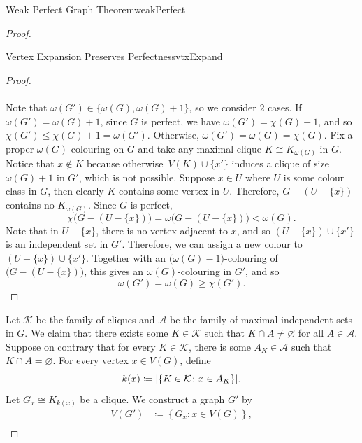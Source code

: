 \documentclass[math]{amznotes}
\theoremstyle{remark}
\begin{document}
\begin{thmbox}{Weak Perfect Graph Theorem}{weakPerfect}
\begin{proof}
\begin{lembox}{Vertex Expansion Preserves Perfectness}{vtxExpand}
\begin{proof}
                \\\\
                Note that $\omega(G') \in \{\omega(G), \omega(G) + 1\}$, so we consider $2$ cases. If $\omega(G') = \omega(G) + 1$, since $G$ is perfect, we have $\omega(G') = \chi(G) + 1$, and so $\chi(G') \leq \chi(G) + 1 = \omega(G')$. Otherwise, $\omega(G') = \omega(G) = \chi(G)$. Fix a proper $\omega(G)$-colouring on $G$ and take any maximal clique $K \cong K_{\omega(G)}$ in $G$. Notice that $x \notin K$ because otherwise~$V(K) \cup \{x'\}$ induces a clique of size $\omega(G) + 1$ in $G'$, which is not possible. Suppose $x \in U$ where $U$ is some colour class in $G$, then clearly $K$ contains some vertex in $U$. Therefore, $G - (U - \{x\})$ contains no $K_{\omega(G)}$. Since $G$ is perfect,
                \begin{equation*}
                    \chi\bigl(G - (U - \{x\})\bigr) = \omega\bigl(G - (U - \{x\})\bigr) < \omega(G).
                \end{equation*}
                Note that in $U - \{x\}$, there is no vertex adjacent to $x$, and so $(U - \{x\}) \cup \{x'\}$ is an independent set in $G'$. Therefore, we can assign a new colour to $(U - \{x\}) \cup \{x'\}$. Together with an $\bigl(\omega(G) - 1\bigr)$-colouring of $\bigl(G - (U - \{x\})\bigr)$, this gives an $\omega(G)$-colouring in $G'$, and so 
                \begin{equation*}
                    \omega(G') = \omega(G) \geq \chi(G').
                \end{equation*}
            \end{proof}
        \end{lembox}
        Let $\mathcal{K}$ be the family of cliques and $\mathcal{A}$ be the family of maximal independent sets in $G$. We claim that there exists some $K \in \mathcal{K}$ such that $K \cap A \neq \varnothing$ for all $A \in \mathcal{A}$. Suppose on contrary that for every $K \in \mathcal{K}$, there is some $A_K \in \mathcal{A}$ such that $K \cap A = \varnothing$. For every vertex $x \in V(G)$, define 
        \begin{equation*}
            k(x) \coloneqq {\left\lvert {\left\{K \in \mathcal{K} \colon x \in A_K\right\}} \right\rvert}.
        \end{equation*}
        Let $G_x \cong K_{k(x)}$ be a clique. We construct a graph $G'$ by 
        \begin{align*}
            V(G') & \coloneqq \left\{G_x \colon x \in V(G)\right\}, \\

\end{align*}
\end{proof}
\end{thmbox}
\end{document}
